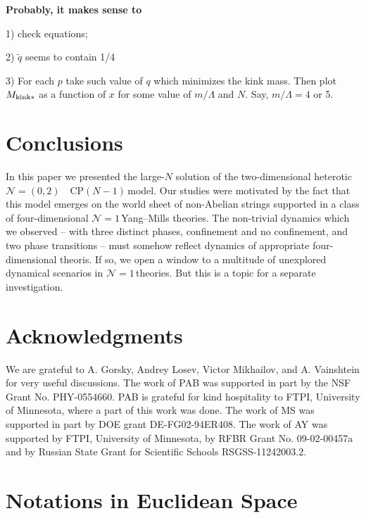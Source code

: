 \documentclass[epsfig,12pt]{article}
\newcommand{\none}{${\mathcal N}=1\,$}
\newcommand{\cpn}{CP$(N-1)\,$}
\newcommand{\ntwoo}{${\mathcal N}= \left(0,2\right) $ }
\begin{document}
{\vspace{1cm}

{\bf Probably, it makes sense to }

1) check equations;

2) $\tilde q$ seems to contain 1/4

3) For each $p$ take such value of $q$ which minimizes the kink mass.
Then plot $M_{\rm kink*}$ as a function of $x$
for some value of $m/\Lambda$ and $N$. Say,
$m/\Lambda = 4$ or 5.

\newpage

\section{Conclusions}
\label{conclu}

In this paper we presented the large-$N$ solution of the
two-dimensional  heterotic $\mbox{\ntwoo}$
\cpn model. Our studies were motivated by the fact
that this model emerges on the world sheet of non-Abelian strings
supported in a class of four-dimensional \none Yang--Mills theories.
The non-trivial dynamics which we observed -- with three distinct phases, confinement and no confinement,
 and two phase transitions --
must somehow reflect  dynamics of appropriate four-dimensional
 theoris. If so, we open a window to a multitude of
unexplored dynamical scenarios in \none theories. But this is a topic for a separate investigation.

\section*{Acknowledgments}

We are grateful to A. Gorsky, Andrey Losev, Victor Mikhailov, and A. Vainshtein 
for very useful discussions.
The work of PAB was supported in part by the NSF Grant No. PHY-0554660. 
PAB is grateful for kind hospitality to FTPI, University of Minnesota, where a part of this work was done. 
The work of MS was supported in part by DOE grant DE-FG02-94ER408. 
The work of AY was  supported 
by  FTPI, University of Minnesota, 
by RFBR Grant No. 09-02-00457a 
and by Russian State Grant for 
Scientific Schools RSGSS-11242003.2.


\newpage

\setcounter{section}{0}
\renewcommand{\thesection}{\Alph{section}}

\section{Notations in Euclidean Space}
\label{app:eucl}
%
%

}
\end{document}
